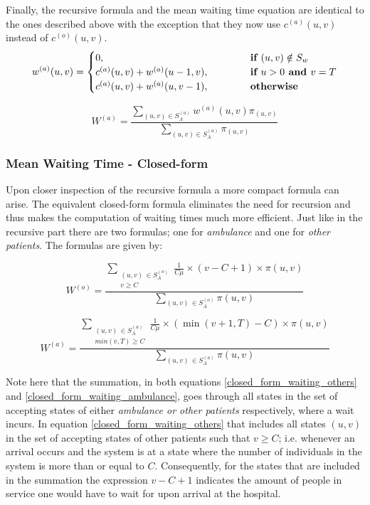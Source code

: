 Finally, the recursive formula and the mean waiting time equation are identical 
to the ones described above with the exception that they now use \(c^{(a)}(u,v)\) 
instead of \(c^{(o)}(u,v)\).
\begin{equation}
    w^{(a)}(u,v) = 
    \begin{cases} 
        0, \hspace{4.85cm} & \textbf{if } (u,v) \notin S_w \\
        c^{(a)}(u,v) + w^{(a)}(u-1, v), & \textbf{if } u > 0 \textbf{ and } v = T \\
        c^{(a)}(u,v) + w^{(a)}(u, v-1), & \textbf{otherwise}
    \end{cases}
\end{equation}

\begin{equation}
    W^{(a)} = \frac{\sum_{(u,v) \in S_A^{(a)}} w^{(a)}(u,v) \pi_{(u,v)}}
    {\sum_{(u,v) \in S_A^{(a)}} \pi_{(u,v)}}
\end{equation}

\subsubsection{Mean Waiting Time - Closed-form}
Upon closer inspection of the recursive formula a more compact formula can arise. 
The equivalent closed-form formula eliminates the need for recursion and thus makes 
the computation of waiting times much more efficient. 
Just like in the recursive part there are two formulas; one for \textit{ambulance} 
and one for \textit{other patients}. 
The formulas are given by:

\begin{equation} \label{closed_form_waiting_others}
    W^{(o)} = \frac{\sum_{\substack{(u,v) \, \in S_A^{(o)} \\ v \geq C}} 
    \frac{1}{C \mu} \times (v-C+1) \times \pi(u,v)}{\sum_{(u,v) \, 
    \in S_A^{(o)}} \pi(u,v)}
\end{equation}
    
\begin{equation}\label{closed_form_waiting_ambulance}
    W^{(a)} = \frac{\sum_{\substack{(u,v) \, \in S_A^{(a)} \\ min(v,T) \geq C}} 
    \frac{1}{C \mu} \times (\min(v+1,T)-C) \times \pi(u,v)}{\sum_{(u,v) \, 
    \in S_A^{(a)}} \pi(u,v)}
\end{equation}

Note here that the summation, in both equations \ref{closed_form_waiting_others} 
and \ref{closed_form_waiting_ambulance}, goes through all states in the set of accepting 
states of either \textit{ambulance or other patients} respectively, where a wait 
incurs. 
In equation \ref{closed_form_waiting_others} that includes all states \((u,v)\) 
in the set of accepting states of other patients such that \( v \geq C\); i.e. 
whenever an arrival occurs and the system is at a state where the number of individuals 
in the system is more than or equal to $C$. 
Consequently, for the states that are included in the summation  the expression 
\( v-C+1 \) indicates the amount of people in service one would have to wait for 
upon arrival at the hospital.


